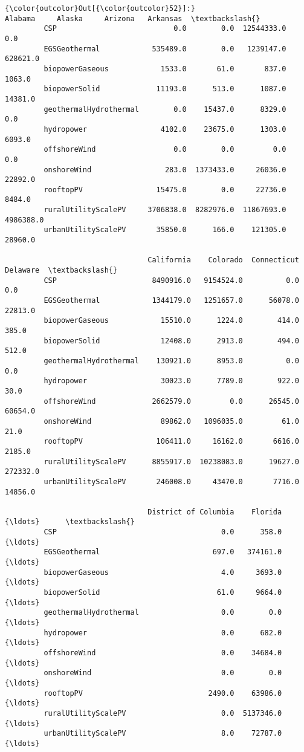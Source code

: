 \documentclass[11pt]{article}
\begin{document}
\begin{Verbatim}[commandchars=\\\{\}]
{\color{outcolor}Out[{\color{outcolor}52}]:}                           Alabama     Alaska     Arizona   Arkansas  \textbackslash{}
         CSP                           0.0        0.0  12544333.0        0.0   
         EGSGeothermal            535489.0        0.0   1239147.0   628621.0   
         biopowerGaseous            1533.0       61.0       837.0     1063.0   
         biopowerSolid             11193.0      513.0      1087.0    14381.0   
         geothermalHydrothermal        0.0    15437.0      8329.0        0.0   
         hydropower                 4102.0    23675.0      1303.0     6093.0   
         offshoreWind                  0.0        0.0         0.0        0.0   
         onshoreWind                 283.0  1373433.0     26036.0    22892.0   
         rooftopPV                 15475.0        0.0     22736.0     8484.0   
         ruralUtilityScalePV     3706838.0  8282976.0  11867693.0  4986388.0   
         urbanUtilityScalePV       35850.0      166.0    121305.0    28960.0   
         
                                 California    Colorado  Connecticut  Delaware  \textbackslash{}
         CSP                      8490916.0   9154524.0          0.0       0.0   
         EGSGeothermal            1344179.0   1251657.0      56078.0   22813.0   
         biopowerGaseous            15510.0      1224.0        414.0     385.0   
         biopowerSolid              12408.0      2913.0        494.0     512.0   
         geothermalHydrothermal    130921.0      8953.0          0.0       0.0   
         hydropower                 30023.0      7789.0        922.0      30.0   
         offshoreWind             2662579.0         0.0      26545.0   60654.0   
         onshoreWind                89862.0   1096035.0         61.0      21.0   
         rooftopPV                 106411.0     16162.0       6616.0    2185.0   
         ruralUtilityScalePV      8855917.0  10238083.0      19627.0  272332.0   
         urbanUtilityScalePV       246008.0     43470.0       7716.0   14856.0   
         
                                 District of Columbia    Florida    {\ldots}      \textbackslash{}
         CSP                                      0.0      358.0    {\ldots}       
         EGSGeothermal                          697.0   374161.0    {\ldots}       
         biopowerGaseous                          4.0     3693.0    {\ldots}       
         biopowerSolid                           61.0     9664.0    {\ldots}       
         geothermalHydrothermal                   0.0        0.0    {\ldots}       
         hydropower                               0.0      682.0    {\ldots}       
         offshoreWind                             0.0    34684.0    {\ldots}       
         onshoreWind                              0.0        0.0    {\ldots}       
         rooftopPV                             2490.0    63986.0    {\ldots}       
         ruralUtilityScalePV                      0.0  5137346.0    {\ldots}       
         urbanUtilityScalePV                      8.0    72787.0    {\ldots}       
         

\end{Verbatim}
\end{document}
